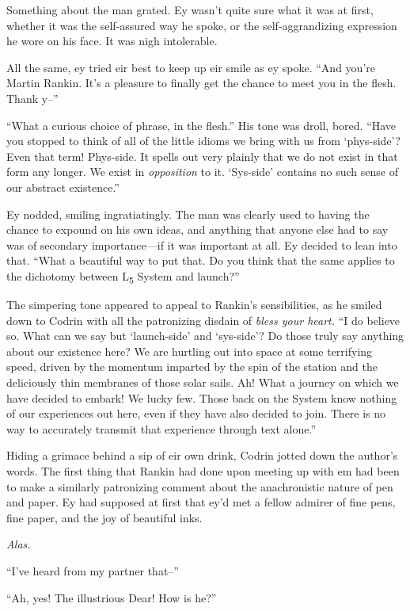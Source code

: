 Something about the man grated. Ey wasn't quite sure what it was at first, whether it was the self-assured way he spoke, or the self-aggrandizing expression he wore on his face. It was nigh intolerable.

All the same, ey tried eir best to keep up eir smile as ey spoke. ``And you're Martin Rankin. It's a pleasure to finally get the chance to meet you in the flesh. Thank y--''

``What a curious choice of phrase, in the flesh.'' His tone was droll, bored. ``Have you stopped to think of all of the little idioms we bring with us from `phys-side'? Even that term! Phys-side. It spells out very plainly that we do not exist in that form any longer. We exist in \emph{opposition} to it. `Sys-side' contains no such sense of our abstract existence.''

Ey nodded, smiling ingratiatingly. The man was clearly used to having the chance to expound on his own ideas, and anything that anyone else had to say was of secondary importance---if it was important at all. Ey decided to lean into that. ``What a beautiful way to put that. Do you think that the same applies to the dichotomy between L\textsubscript{5} System and launch?''

The simpering tone appeared to appeal to Rankin's sensibilities, as he smiled down to Codrin with all the patronizing disdain of \emph{bless your heart.} ``I do believe so. What can we say but `launch-side' and `sys-side'? Do those truly say anything about our existence here? We are hurtling out into space at some terrifying speed, driven by the momentum imparted by the spin of the station and the deliciously thin membranes of those solar sails. Ah! What a journey on which we have decided to embark! We lucky few. Those back on the System know nothing of our experiences out here, even if they have also decided to join. There is no way to accurately transmit that experience through text alone.''

Hiding a grimace behind a sip of eir own drink, Codrin jotted down the author's words. The first thing that Rankin had done upon meeting up with em had been to make a similarly patronizing comment about the anachronistic nature of pen and paper. Ey had supposed at first that ey'd met a fellow admirer of fine pens, fine paper, and the joy of beautiful inks.

\emph{Alas.}

``I've heard from my partner that--''

``Ah, yes! The illustrious Dear! How is he?''


